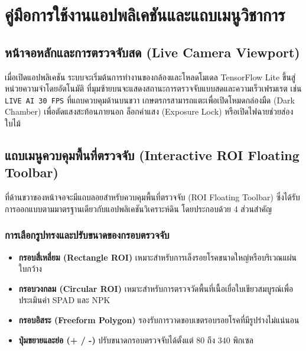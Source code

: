\chapter{คู่มือการใช้งานแอปพลิเคชันและแถบเมนูวิชาการ}

\section{หน้าจอหลักและการตรวจจับสด (Live Camera Viewport)}
เมื่อเปิดแอปพลิเคชัน ระบบจะเริ่มต้นการทำงานของกล้องและโหลดโมเดล TensorFlow Lite ขึ้นสู่หน่วยความจำโดยอัตโนมัติ ที่มุมซ้ายบนจะแสดงสถานะการตรวจจับแบบสดและความเร็วเฟรมเรต เช่น \texttt{LIVE AI 30 FPS} ที่แถบควบคุมด้านบนขวา เกษตรกรสามารถแตะเพื่อเปิดโหมดกล่องมืด (Dark Chamber) เพื่อตัดแสงสะท้อนภายนอก ล็อกค่าแสง (Exposure Lock) หรือเปิดไฟฉายช่วยส่องใบไม้

\section{แถบเมนูควบคุมพื้นที่ตรวจจับ (Interactive ROI Floating Toolbar)}
ที่ด้านขวาของหน้าจอจะมีแถบลอยสำหรับควบคุมพื้นที่ตรวจจับ (ROI Floating Toolbar) ซึ่งได้รับการออกแบบตามมาตรฐานเดียวกับแอปพลิเคชันวิเคราะห์ดิน โดยประกอบด้วย 4 ส่วนสำคัญ

\subsection{การเลือกรูปทรงและปรับขนาดของกรอบตรวจจับ}
\begin{itemize}
  \item \textbf{กรอบสี่เหลี่ยม (Rectangle ROI)} เหมาะสำหรับการเล็งรอยโรคขนาดใหญ่หรือบริเวณแผ่นใบกว้าง
  \item \textbf{กรอบวงกลม (Circular ROI)} เหมาะสำหรับการตรวจวัดพื้นที่เนื้อเยื่อใบเขียวสมบูรณ์เพื่อประเมินค่า SPAD และ NPK
  \item \textbf{กรอบอิสระ (Freeform Polygon)} รองรับการวาดขอบเขตรอบรอยโรคที่มีรูปร่างไม่แน่นอน
  \item \textbf{ปุ่มขยายและย่อ (+ / -)} ปรับขนาดกรอบตรวจจับได้ตั้งแต่ $80$ ถึง $340$ พิกเซล
\end{itemize}

